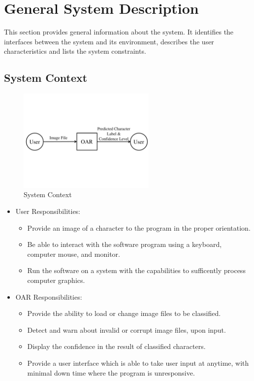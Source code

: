 \documentclass[12pt]{article}
\begin{document}
\section{General System Description}

This section provides general information about the system.  It identifies the
interfaces between the system and its environment, describes the user
characteristics and lists the system constraints.  

\subsection{System Context}

\begin{figure}[h!]
\begin{center}
 \includegraphics[width=0.6\textwidth]{SystemContextFigure}
\caption{System Context}
\label{Fig_SystemContext} 
\end{center}
\end{figure}


\begin{itemize}
\item User Responsibilities:
\begin{itemize}
\item Provide an image of a character to the program in the proper orientation.
\item Be able to interact with the software program using a keyboard, computer mouse, and monitor.
\item Run the software on a system with the capabilities to sufficently process computer graphics.
\end{itemize}
\item OAR Responsibilities:
\begin{itemize}
\item Provide the ability to load or change image files to be classified.
\item Detect and warn about invalid or corrupt image files, upon input.
\item Display the confidence in the result of classified characters.
\item Provide a user interface which is able to take user input at anytime, with minimal down time where the program is unresponsive.
\end{itemize}
\end{itemize}
\end{document}
